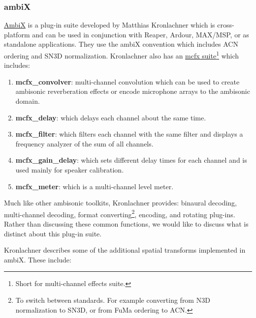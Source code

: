 
\subsubsection{ambiX}

\href{http://www.matthiaskronlachner.com/?p=2015}{AmbiX} is a plug-in suite developed by Matthias Kronlachner which is cross-platform and can be used in conjunction with Reaper, Ardour, MAX/MSP, or as standalone applications. They use the ambiX convention which includes ACN ordering and SN3D normalization. Kronlachner also has an \href{http://www.matthiaskronlachner.com/?p=1910}{mcfx suite}\footnote{Short for multi-channel effects suite.} which includes:

\begin{enumerate}
    \item \textbf{mcfx\_convolver}: multi-channel convolution which can be used to create ambisonic reverberation effects or encode microphone arrays to the ambisonic domain. 
    \item \textbf{mcfx\_delay}: which delays each channel about the same time.
    \item \textbf{mcfx\_filter}: which filters each channel with the same filter and displays a frequency analyzer of the sum of all channels.
    \item \textbf{mcfx\_gain\_delay}: which sets different delay times for each channel and is used mainly for speaker calibration.
    \item \textbf{mcfx\_meter}: which is a multi-channel level meter.
\end{enumerate}

Much like other ambisonic toolkits, Kronlachner provides: binaural decoding, multi-channel decoding, format converting\footnote{To switch between standards. For example converting from N3D normalization to SN3D, or from FuMa ordering to ACN.}, encoding, and rotating plug-ins. Rather than discussing these common functions, we would like to discuss what is distinct about this plug-in suite. 

Kronlachner \cite{kronlachner2014spatial} describes some of the additional spatial transforms implemented in ambiX. These include:

